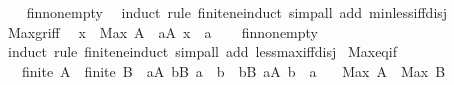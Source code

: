 \begin{isabellebody}
%
\isadelimproof
\ \ %
\endisadelimproof
%
\isatagproof
{}\isamarkupfalse%
\ fin{\isacharunderscore}{\kern0pt}nonempty\ \isamarkupfalse%
\ {\isacharparenleft}{\kern0pt}induct\ rule{\isacharcolon}{\kern0pt}\ finite{\isacharunderscore}{\kern0pt}ne{\isacharunderscore}{\kern0pt}induct{\isacharparenright}{\kern0pt}\ {\isacharparenleft}{\kern0pt}simp{\isacharunderscore}{\kern0pt}all\ add{\isacharcolon}{\kern0pt}\ min{\isacharunderscore}{\kern0pt}less{\isacharunderscore}{\kern0pt}iff{\isacharunderscore}{\kern0pt}disj{\isacharparenright}{\kern0pt}%
\endisatagproof
{\isafoldproof}%
%
\isadelimproof
\isanewline
%
\endisadelimproof
\isanewline
{}\isamarkupfalse%
\ Max{\isacharunderscore}{\kern0pt}gr{\isacharunderscore}{\kern0pt}iff{\isacharcolon}{\kern0pt}\isanewline
\ \ {\isachardoublequoteopen}x\ {\isacharless}{\kern0pt}\ Max\ A\ {\isasymlongleftrightarrow}\ {\isacharparenleft}{\kern0pt}{\isasymexists}a{\isasymin}A{\isachardot}{\kern0pt}\ x\ {\isacharless}{\kern0pt}\ a{\isacharparenright}{\kern0pt}{\isachardoublequoteclose}\isanewline
%
\isadelimproof
\ \ %
\endisadelimproof
%
\isatagproof
{}\isamarkupfalse%
\ fin{\isacharunderscore}{\kern0pt}nonempty\ \isamarkupfalse%
\ {\isacharparenleft}{\kern0pt}induct\ rule{\isacharcolon}{\kern0pt}\ finite{\isacharunderscore}{\kern0pt}ne{\isacharunderscore}{\kern0pt}induct{\isacharparenright}{\kern0pt}\ {\isacharparenleft}{\kern0pt}simp{\isacharunderscore}{\kern0pt}all\ add{\isacharcolon}{\kern0pt}\ less{\isacharunderscore}{\kern0pt}max{\isacharunderscore}{\kern0pt}iff{\isacharunderscore}{\kern0pt}disj{\isacharparenright}{\kern0pt}%
\endisatagproof
{\isafoldproof}%
%
\isadelimproof
\isanewline
%
\endisadelimproof
\isanewline
{}\isamarkupfalse%
\isanewline
\isanewline
{}\isamarkupfalse%
\ Max{\isacharunderscore}{\kern0pt}eq{\isacharunderscore}{\kern0pt}if{\isacharcolon}{\kern0pt}\isanewline
\ \ \ {\isachardoublequoteopen}finite\ A{\isachardoublequoteclose}\ \ {\isachardoublequoteopen}finite\ B{\isachardoublequoteclose}\ \ {\isachardoublequoteopen}{\isasymforall}a{\isasymin}A{\isachardot}{\kern0pt}\ {\isasymexists}b{\isasymin}B{\isachardot}{\kern0pt}\ a\ {\isasymle}\ b{\isachardoublequoteclose}\ \ {\isachardoublequoteopen}{\isasymforall}b{\isasymin}B{\isachardot}{\kern0pt}\ {\isasymexists}a{\isasymin}A{\isachardot}{\kern0pt}\ b\ {\isasymle}\ a{\isachardoublequoteclose}\isanewline
\ \ \ {\isachardoublequoteopen}Max\ A\ {\isacharequal}{\kern0pt}\ Max\ B{\isachardoublequoteclose}\isanewline

\end{isabellebody}
